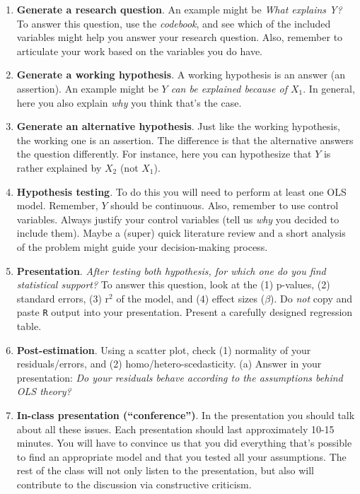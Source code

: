 \documentclass[10pt]{article}
\begin{document}
\begin{enumerate}
	\item {\bf Generate a research question}. An example might be \emph{What explains Y?} To answer this question, use the \emph{codebook}, and see which of the included variables might help you answer your research question. Also, remember to articulate your work based on the variables you do have.
	
	\item {\bf Generate a working hypothesis}. A working hypothesis is an answer (an assertion). An example might be \emph{$Y$ can be explained because of $X_{1}$}. In general, here you also explain \emph{why} you think that's the case.
	
	\item  {\bf Generate an alternative hypothesis}. Just like the working hypothesis, the working one is an assertion. The difference is that the alternative answers the question differently. For instance, here you can hypothesize that $Y$ is rather explained by $X_{2}$ (not $X_{1}$).
	
	\item {\bf Hypothesis testing}. To do this you will need to perform at least one OLS model. Remember, $Y$ should be continuous. Also, remember to use control variables. Always justify your control variables (tell us \emph{why} you decided to include them). Maybe a (super) quick literature review and a short analysis of the problem might guide your decision-making process.


	\item {\bf Presentation}.  \emph{After testing both hypothesis, for which one do you find statistical support?} To answer this question, look at the (1) p-values, (2) standard errors, (3) r$^{2}$ of the model, and (4) effect sizes ($\beta$). Do \emph{not} copy and paste \texttt{R} output into your presentation. Present a carefully designed regression table.

	\item {\bf Post-estimation}. Using a scatter plot, check (1) normality of your residuals/errors, and (2) homo/hetero-scedasticity. (a) Answer in your presentation: \emph{Do your residuals behave according to the assumptions behind OLS theory?}

	\item {\bf In-class presentation (``conference'')}. In the presentation you should talk about all these issues. Each presentation should last approximately 10-15 minutes. You will have to convince us that you did everything that's possible to find an appropriate model and that you tested all your assumptions. The rest of the class will not only listen to the presentation, but also will contribute to the discussion via constructive criticism. 


\end{enumerate}
\end{document}
